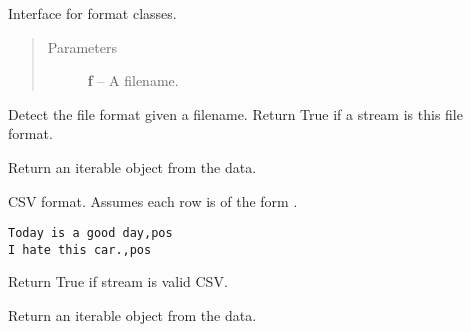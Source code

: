 \documentclass[letterpaper,10pt,english]{sphinxmanual}
\begin{document}
\begin{fulllineitems}
\label{api_reference:textblob.formats.BaseFormat}
Interface for format classes.
\begin{quote}\begin{description}
\item[{Parameters}] \leavevmode
\textbf{f} -- A filename.

\end{description}\end{quote}

\begin{fulllineitems}
\label{api_reference:textblob.formats.BaseFormat.detect}
Detect the file format given a filename.
Return True if a stream is this file format.

\end{fulllineitems}


\begin{fulllineitems}
\label{api_reference:textblob.formats.BaseFormat.to_iterable}
Return an iterable object from the data.

\end{fulllineitems}


\end{fulllineitems}


\begin{fulllineitems}
\label{api_reference:textblob.formats.CSV}
CSV format. Assumes each row is of the form .

\begin{Verbatim}[commandchars=\\\{\}]
Today is a good day,pos
I hate this car.,pos
\end{Verbatim}

\begin{fulllineitems}
\label{api_reference:textblob.formats.CSV.detect}
Return True if stream is valid CSV.

\end{fulllineitems}


\begin{fulllineitems}
\label{api_reference:textblob.formats.CSV.to_iterable}
Return an iterable object from the data.

\end{fulllineitems}


\end{fulllineitems}
\end{document}
